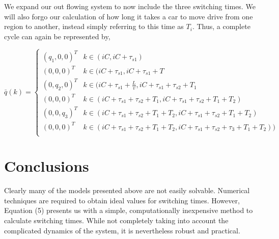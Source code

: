 \documentclass[a4paper]{article}
\begin{document}
We expand our out flowing system to now include the three switching times. We will also forgo our calculation of how long it takes a car to move drive from one region to another, instead simply referring to this time as $T_i$. Thus, a complete cycle can again be represented by,

\[\bar{q}(k) = \begin{cases}
(q_1 , 0, 0)^T & k\in (iC, iC+\tau_{s1}) \\
(0,0,0) ^T & k \in (iC+\tau_{s1}, iC+\tau_{s1} + T \\
(0, q_2, 0)^T & k \in (iC+\tau_{s1} + \frac{L}{v}, iC+\tau_{s1} + \tau_{s2} +T_1 \\
(0,0, 0)^T  & k \in (iC+\tau_{s1} + \tau_{s2} + T_1, iC+\tau_{s1} + \tau_{s2} + T_1 +T_2) \\
(0,0, q_3)^T  & k \in (iC+\tau_{s1} + \tau_{s2} + T_1 +T_2, iC+\tau_{s1} + \tau_{s2} + T_1 +T_2) \\
(0,0,0) ^T & k \in ( iC+\tau_{s1} + \tau_{s2} + T_1 +T_2,  iC+\tau_{s1} + \tau_{s2} +\tau_3 + T_1 +T_2)) \\
\end{cases}
\]


\section{Conclusions}
Clearly many of the models presented above are not easily solvable. Numerical techniques are required to obtain ideal values for switching times. However, Equation (5) presents us with a simple, computationally inexpensive method to calculate switching times. While not completely taking into account the complicated dynamics of the system, it is nevertheless robust and practical.
\end{document}
